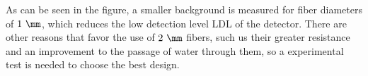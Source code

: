 As can be seen in the figure, a smaller background is measured for fiber diameters of $1~\mm$, which reduces the low detection level LDL of the detector. There are other reasons that favor the use of $2~\mm$ fibers, such us their greater resistance and an improvement to the passage of water through them, so a experimental test is needed to choose the best design.